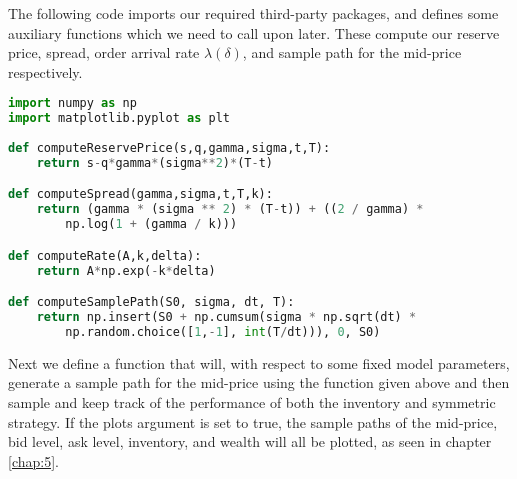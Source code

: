 The following code imports our required third-party packages, and defines some 
auxiliary functions which we need to call upon later. These compute our reserve 
price, spread, order arrival rate $\lambda(\delta)$, and sample path for the mid-price
respectively.

\begin{lstlisting}[language=Python, caption=Auxiliary Functions]
import numpy as np
import matplotlib.pyplot as plt
    
def computeReservePrice(s,q,gamma,sigma,t,T):
    return s-q*gamma*(sigma**2)*(T-t)

def computeSpread(gamma,sigma,t,T,k):
    return (gamma * (sigma ** 2) * (T-t)) + ((2 / gamma) * 
        np.log(1 + (gamma / k)))

def computeRate(A,k,delta):
    return A*np.exp(-k*delta)

def computeSamplePath(S0, sigma, dt, T):
    return np.insert(S0 + np.cumsum(sigma * np.sqrt(dt) * 
        np.random.choice([1,-1], int(T/dt))), 0, S0)
\end{lstlisting}

Next we define a function that will, with respect to some fixed model parameters, 
generate a sample path for the mid-price using the function given above and then 
sample and keep track of the performance of both the inventory and symmetric strategy.
If the plots argument is set to true, the sample paths of the mid-price, bid level, ask
level, inventory, and wealth will all be plotted, as seen in chapter \ref{chap:5}.

